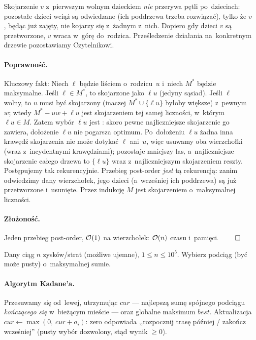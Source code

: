 \noindent Skojarzenie $v$ z~pierwszym wolnym dzieckiem \emph{nie} przerywa pętli
po~dzieciach: pozostałe dzieci wciąż są odwiedzane (ich poddrzewa trzeba
rozwiązać), tylko że $v$, będąc już zajęty, nie kojarzy się z~żadnym z~nich.
Dopiero gdy  dzieci $v$ są przetworzone, $v$ wraca w~górę
do~rodzica. Prześledzenie działania na~konkretnym drzewie pozostawiamy
Czytelnikowi.

\paragraph{Poprawność.}
Kluczowy fakt:  Niech $\ell$ będzie liściem o~rodzicu~$u$
i~niech $M^*$ będzie maksymalne. Jeśli $\ell\in M^*$, to skojarzone jako
$\ell u$ (jedyny sąsiad). Jeśli $\ell$ wolny, to $u$ musi być skojarzony (inaczej
$M^*\cup\{\ell u\}$ byłoby większe) z~pewnym $w$; wtedy
$M^*-uw+\ell u$ jest skojarzeniem tej samej liczności, w~którym $\ell u\in M$.
Zatem wybór $\ell u$ jest : skoro pewne najliczniejsze
skojarzenie go zawiera, dołożenie $\ell u$ nie pogarsza optimum. Po~dołożeniu
$\ell u$ żadna inna krawędź skojarzenia nie może dotykać $\ell$ ani~$u$, więc
usuwamy oba wierzchołki (wraz z~incydentnymi krawędziami); pozostaje mniejszy
las, a~najliczniejsze skojarzenie całego drzewa to $\{\ell u\}$ wraz
z~najliczniejszym skojarzeniem reszty. Postępujemy tak rekurencyjnie. Przebieg
post-order \emph{jest} tą rekurencją: zanim odwiedzimy dany wierzchołek, jego
dzieci (a~wcześniej ich poddrzewa) są już przetworzone i~usunięte. Przez
indukcję $M$ jest skojarzeniem o~maksymalnej liczności.

\paragraph{Złożoność.}
Jeden przebieg post-order, $\mathcal{O}(1)$ na wierzchołek: $\mathcal{O}(n)$ czasu
i~pamięci. $\qed$

\clearpage
\begin{zadanie}
	Dany ciąg $n$ zysków/strat (możliwe ujemne), $1\le n\le 10^5$. Wybierz
	 podciąg (być może pusty) o~maksymalnej sumie.
\end{zadanie}

\paragraph{Algorytm Kadane'a.}
Przesuwamy się od~lewej, utrzymując $\mathit{cur}$ --- najlepszą sumę spójnego
podciągu \emph{kończącego się} w~bieżącym mieście --- oraz globalne maksimum
$\mathit{best}$. Aktualizacja $\mathit{cur}\gets\max(0,\ \mathit{cur}+a_i)$:
zero odpowiada ,,rozpocznij trasę później / zakończ wcześniej'' (pusty wybór
dozwolony, stąd wynik $\ge 0$).

